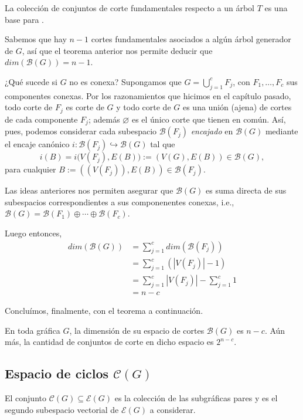 \begin{teo}
La colección de conjuntos de corte fundamentales respecto a un árbol $T$ es una base para \bondt.
\end{teo}

Sabemos que hay $n-1$ cortes fundamentales asociados a algún árbol generador de $G$, así que el teorema anterior nos permite deducir que $dim(\mathcal{B}(G))=n-1$.

¿Qué sucede si $G$ no es conexa? Supongamos que $G = \bigcup_{j=1}^{c}F_{j}$, con $F_{1}, \ldots, F_{c}$ sus componentes conexas. Por los razonamientos que hicimos en el capítulo pasado, todo corte de $F_{j}$ es corte de $G$ y todo corte de $G$ es una unión (ajena) de cortes de cada componente $F_{j}$; además  $\varnothing$ es el único corte que tienen en común. Así, pues, podemos considerar cada subespacio $\mathcal{B}(F_{j})$ \textit{encajado} en $\mathcal{B}(G)$ mediante el encaje canónico $i \colon \mathcal{B}(F_{j}) \hookrightarrow \mathcal{B}(G)$ tal que $$i(B) =i\Big(V(F_{j}), E(B)\Big) := (V(G),E(B)) \in \mathcal{B}(G),$$ para cualquier $B:=((V(F_{j})), E(B)) \in \mathcal{B}(F_{j})$.

Las ideas anteriores nos permiten asegurar que $\mathcal{B}(G)$ es suma directa de sus subespacios correspondientes a sus componenentes conexas, i.e., $\mathcal{B}(G)= \mathcal{B}(F_{1}) \oplus \cdots \oplus \mathcal{B}(F_{c})$.

Luego entonces, 
\begin{align*}
    dim(\mathcal{B}(G)) &= \sum_{j = 1}^{c}dim(\mathcal{B}(F_{j}))\\
    &= \sum_{j = 1}^{c} (|V(F_{j})| - 1) \\
    &= \sum_{j=1}^{c} |V(F_{j})| - \sum_{j=1}^{c} 1\\
    &= n - c
\end{align*}

Concluímos, finalmente, con el teorema a continuación.

\begin{teo} \label{teo:dimcortes}
En toda gráfica $G$, la dimensión de su espacio de cortes $\mathcal{B}(G)$ es $n-c$. Aún más, la cantidad de conjuntos de corte en dicho espacio es $2^{n-c}$.
\end{teo}

\subsection{Espacio de ciclos $\mathcal{C}(G)$}

El conjunto $\mathcal{C}(G) \subseteq \mathcal{E}(G)$ es la colección de las subgráficas pares y es el segundo subespacio vectorial de $\mathcal{E}(G)$ a considerar.

